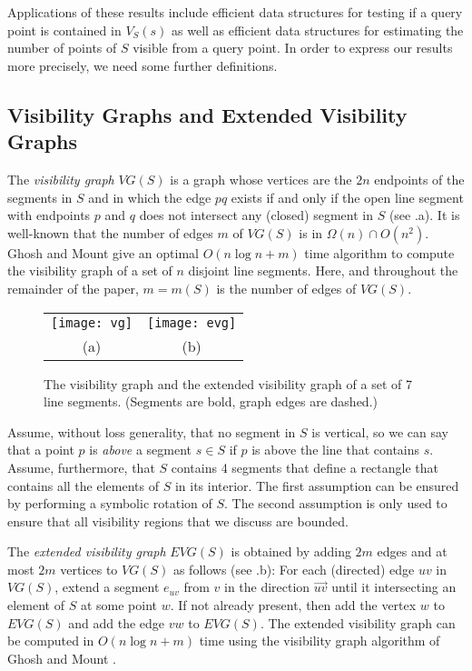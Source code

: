 \documentclass{patmorin}
\newcommand{\VG}{\mathit{VG}}
\newcommand{\EVG}{\mathit{EVG}}
\begin{document}
Applications of these results include efficient data structures for testing
if a query point is contained in $V_S(s)$ as well as efficient data
structures for estimating the number of points of $S$ visible from a query
point. In order to express our results more precisely, we need some further
definitions.

\subsection{Visibility Graphs and Extended Visibility Graphs}

The \emph{visibility graph} $\VG(S)$ is a graph whose vertices are the
$2n$ endpoints of the segments in $S$ and in which the edge $pq$ exists
if and only if the open line segment with endpoints $p$ and $q$ does
not intersect any (closed) segment in $S$ (see .a).  It is
well-known that the number of edges $m$ of $\VG(S)$ is in $\Omega(n)\cap
O(n^2)$.  Ghosh and Mount \cite{gm91} give an optimal $O(n\log n+ m)$
time algorithm to compute the visibility graph of a set of $n$ disjoint
line segments.  Here, and throughout the remainder of the paper, $m=m(S)$
is the number of edges of $\VG(S)$.

\begin{figure}
  \begin{center}
    \begin{tabular}{cc}
    \texttt{[image: vg]} & \texttt{[image: evg]} \\
    (a) & (b)
    \end{tabular}
  \end{center}
  \caption{The visibility graph and the extended visibility graph of a set
       of 7 line segments. (Segments are bold, graph edges are dashed.)}
\end{figure}

Assume, without loss generality, that no segment in $S$ is vertical, so
we can say that a point $p$ is \emph{above} a segment $s\in S$ if $p$ is
above the line that contains $s$.  Assume, furthermore, that $S$ contains
4 segments that define a rectangle that contains all the elements of $S$
in its interior.  The first assumption can be ensured by performing a
symbolic rotation of $S$.  The second assumption is only used to ensure
that all visibility regions that we discuss are bounded.

The \emph{extended visibility graph} $\EVG(S)$ is obtained by adding
$2m$ edges and at most $2m$ vertices to $\VG(S)$ as follows (see
.b): For each (directed) edge $uv$ in $\VG(S)$, extend a
segment $e_{uv}$ from $v$ in the direction $\overrightarrow{uv}$ until it
intersecting an element of $S$ at some point $w$.  If not already present,
then add the vertex $w$ to $\EVG(S)$ and add the edge $vw$ to $\EVG(S)$.
The extended visibility graph can be computed in $O(n\log n + m)$ time
using the visibility graph algorithm of Ghosh and Mount \cite{gm91}.
\end{document}

